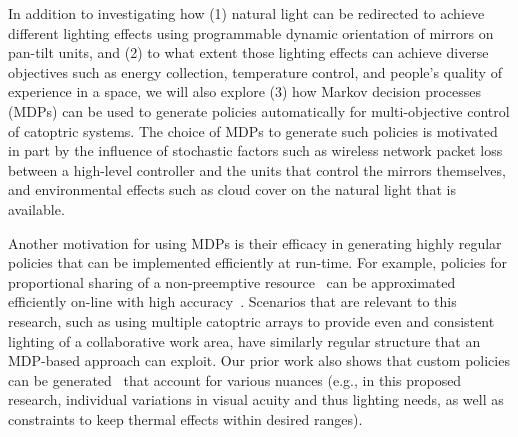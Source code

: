 In addition to investigating how (1) natural light can be redirected to achieve
different lighting effects using programmable dynamic orientation of mirrors on 
pan-tilt units, and (2) to what extent those lighting effects can achieve diverse
objectives such as energy collection, temperature control, and people's quality 
of experience in a space, we will also explore (3) how Markov decision processes 
(MDPs) can be used to generate policies automatically for multi-objective control of 
catoptric systems.  The choice of MDPs to generate such policies is motivated in part 
by the influence of stochastic factors such as wireless network packet loss between
a high-level controller and the units that control the mirrors themselves, and 
environmental effects such as cloud cover on the natural light that is available.

Another motivation for using MDPs is their efficacy in generating highly regular 
policies that can be implemented efficiently at run-time.  For example, policies for
proportional sharing of a non-preemptive resource~\cite{gtgs09,gtsg08} can be 
approximated efficiently on-line with high accuracy~\cite{gtspmgs10}.  Scenarios
that are relevant to this research, such as using multiple catoptric arrays to
provide even and consistent lighting of a collaborative work area, have similarly
regular structure that an MDP-based approach can exploit.  Our prior work also
shows that custom policies can be generated~\cite{tblwgs11,tggs10} that account for various 
nuances (e.g., in this proposed research, individual variations in visual acuity and thus 
lighting needs, as well as constraints to keep thermal effects within desired ranges).


